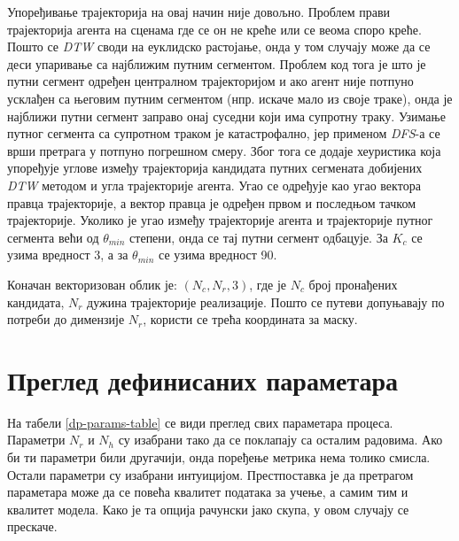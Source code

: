\documentclass[11pt,oneside]{memoir}
\begin{document}
Упоређивање трајекторија на овај начин није довољно. Проблем прави трајекторија агента на сценама где се он не креће или се веома споро креће. Пошто
се \textit{DTW} своди на еуклидско растојање, онда у том случају може да се деси упаривање са најближим путним сегментом. Проблем код тога 
је што је путни сегмент одређен централном трајекторијом и ако агент није потпуно усклађен са његовим путним сегментом (нпр. искаче мало
из своје траке), онда је 
најближи путни сегмент заправо онај суседни који има супротну траку. Узимање путног сегмента са супротном траком је катастрофално,
јер применом \textit{DFS}-а се врши претрага у потпуно погрешном смеру. Због тога се додаје хеуристика која упоређује углове између
трајекторија кандидата путних сегмената добијених \textit{DTW} методом и угла трајекторије агента. Угао се одређује као угао вектора правца
трајекторије, а вектор правца је одређен првом и последњом тачком трајекторије. Уколико је угао између трајекторије агента и 
трајекторије путног сегмента већи од $\theta_{min}$ степени, онда се тај путни сегмент одбацује. За $K_c$ се узима вредност 3, а
за $\theta_{min}$ се узима вредност 90.

Коначан векторизован облик је: $(N_c, N_r, 3)$, где је $N_c$ број пронађених кандидата,
$N_r$ дужина трајекторије реализације. Пошто се путеви допуњавају по потреби до димензије $N_r$, користи се трећа координата
за маску. 

\section{Преглед дефинисаних параметара}

На табели \ref{dp-params-table} се види преглед свих параметара процеса. Параметри $N_r$ и $N_h$ су изабрани тако да се поклапају
са осталим радовима. Ако би ти параметри били другачији, онда поређење метрика нема толико смисла. Остали параметри 
су изабрани интуицијом. Престпоставка је да претрагом параметара може да се повећа квалитет података за учење, а самим тим
и квалитет модела. Како је та опција рачунски јако скупа, у овом случају се прескаче. 
\end{document}
